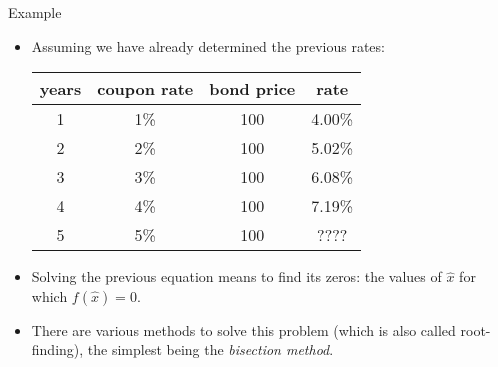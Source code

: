 \documentclass{beamer}
\begin{document}
 \begin{frame}[fragile]{Example}
 \begin{itemize}
 \item Assuming we have already determined the previous rates:
 \begin{center}
 \begin{tabular}{|c|c|c|c|}
 \hline
  years & coupon rate & bond price & rate \\
 \hline
 1 & 1\% & 100 & 4.00\% \\
 \hline
 2 & 2\% & 100 & 5.02\% \\
 \hline
 3 & 3\% & 100 & 6.08\% \\
 \hline
 4 & 4\% & 100 & 7.19\% \\
 \hline
 5 & 5\% & 100 & ???? \\
 \hline
 \end{tabular}
 \end{center}
 \item Solving the previous equation means to find its zeros: the values of $\hat{x}$ for which $f(\hat{x})=0$.
 \item There are various methods to solve this problem (which is also called root-finding), the simplest being the \emph{bisection method}.
  \end{itemize}
 \href{https://colab.research.google.com/drive/1ZPjDST00jXLR1MIXapcyPaNkW-GMNciA?authuser=1#scrollTo=-lhzjhsfe8Qk\&line=1\&uniqifier=1}{}
\end{frame} 
 
% 
% 
% 
%
% 
 
\end{document}
